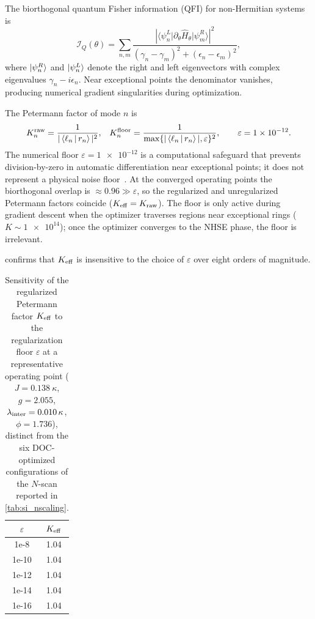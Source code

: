 \documentclass[aps,prxquantum,preprint,superscriptaddress,amsmath,amssymb]{revtex4-2}
\providecommand{\mel}[3]{\langle #1 \vert #2 \vert #3 \rangle}
\newcommand{\lint}{\lambda_{\rm inter}}
\begin{document}
The biorthogonal quantum Fisher information (QFI) for non-Hermitian systems is~\citep{Yao2018}
\begin{equation}\label{eq:si_biorth_qfi}
\mathcal{I}_Q(\theta) = \sum_{n,m} \frac{|\mel{\psi_n^L}{\partial_\theta \hat{H}_\theta}{\psi_m^R}|^2}{(\gamma_n - \gamma_m)^2 + (\epsilon_n - \epsilon_m)^2},
\end{equation}
where $\ket{\psi_n^{R}}$ and $\ket{\psi_n^{L}}$ denote the right and left eigenvectors with complex eigenvalues $\gamma_n - i\epsilon_n$. Near exceptional points the denominator vanishes, producing numerical gradient singularities during optimization.

The Petermann factor of mode $n$ is~\citep{Zhang2019,Caves1982}
\begin{align}\label{eq:si_petermann}
&K_n^{\rm raw}=\frac{1}{|\Braket{\ell_n|r_n}|^2},
&K_n^{\rm floor}=\frac{1}{\max\{|\Braket{\ell_n|r_n}|,\varepsilon\}^2},
\qquad \varepsilon=\num{1e-12}.
\end{align}
The numerical floor $\varepsilon=\num{1e-12}$ is a computational safeguard that prevents division-by-zero in automatic differentiation near exceptional points; it does not represent a physical noise floor~\citep{Bergholtz2021}. At the converged operating points the biorthogonal overlap is $\approx\num{0.96}\gg\varepsilon$, so the regularized and unregularized Petermann factors coincide ($K_{\rm eff}=K_{\rm raw}$). The floor is only active during gradient descent when the optimizer traverses regions near exceptional rings ($K\sim\num{1e14}$); once the optimizer converges to the NHSE phase, the floor is irrelevant.

 confirms that $K_{\rm eff}$ is insensitive to the choice of $\varepsilon$ over eight orders of magnitude.

\begin{table}[hbtp]
\centering
\caption{Sensitivity of the regularized Petermann factor $K_{\rm eff}$ to the regularization floor $\varepsilon$ at a representative operating point ($J=\qty{0.138}{\kappa}$, $g=\num{2.055}$, $\lint=\qty{0.010}{\kappa}$, $\phi=\num{1.736}$), distinct from the six DOC-optimized configurations of the $N$-scan reported in \cref{tab:si_nscaling}.}
\label{tab:si_petermann_sensitivity}
\begin{tabular}{S S}
\toprule
{$\varepsilon$} & {$K_{\rm eff}$} \\
\midrule
1e-8  & 1.04 \\
1e-10 & 1.04 \\
1e-12 & 1.04 \\
1e-14 & 1.04 \\
1e-16 & 1.04 \\
\bottomrule
\end{tabular}
\end{table}
\end{document}
